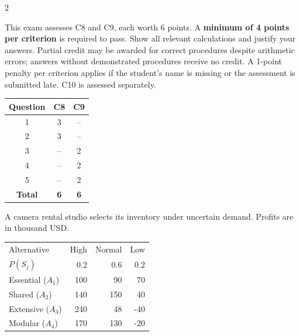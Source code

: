 	\begin{multicols}{2}
		\raggedcolumns
		
		This exam assesses C8 and C9, each worth 6 points. A \textbf{minimum of 4 points per criterion} is required to pass. Show all relevant calculations and justify your answers. Partial credit may be awarded for correct procedures despite arithmetic errors; answers without demonstrated procedures receive no credit. A 1-point penalty per criterion applies if the student's name is missing or the assessment is submitted late. C10 is assessed separately.
		
		\vspace{-3mm}
		\begin{center}
			\begin{tabular}{|c|c|c|}
				\hline
				\textbf{Question} & \textbf{C8} & \textbf{C9} \\ \hline
				1 & 3 & -- \\ \hline
				2 & 3 & -- \\ \hline
				3 & -- & 2 \\ \hline
				4 & -- & 2 \\ \hline
				5 & -- & 2 \\ \hline
				\textbf{Total} & \textbf{6} & \textbf{6} \\ \hline
			\end{tabular}
		\end{center}
		\vspace{-3mm}
		
		
A camera rental studio selects its inventory under uncertain demand. Profits are in thousand USD.

\vspace{-3mm}
\begin{center}\small\setlength{\tabcolsep}{4pt}
	\begin{tabular}{lrrr}\toprule
		Alternative & High & Normal & Low\\
		$P(S_j)$ & 0.2 & 0.6 & 0.2\\ \midrule
		Essential ($A_1$) & 100 & 90 & 70\\
		Shared ($A_2$) & 140 & 150 & 40\\
		Extensive ($A_3$) & 240 & 48 & -40\\
		Modular ($A_4$) & 170 & 130 & -20\\
		\bottomrule
	\end{tabular}
\end{center} \vspace*{-3mm}


\end{multicols}
